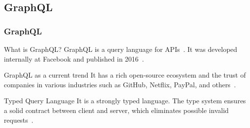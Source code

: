 \subsection{GraphQL}

\begin{frame}\frametitle{GraphQL}

  \begin{block}{What is GraphQL?}
    GraphQL is a query language for APIs~\cite{gql-spec}. It was developed internally at  Facebook and published in 2016~\cite{initial-analysis-of-gql}. 
  \end{block}

  \begin{block}{GraphQL as a current trend}
    It has a rich open-source ecosystem and the trust of companies in various industries such as GitHub, Netflix, PayPal, and others~\cite{morph-gql-1,gql-healthcare}.
  \end{block}

\begin{block}{Typed Query Language}
  It is a strongly typed language. The type system ensures a solid contract between client and server, which eliminates possible invalid requests~\cite{real-time-sys-arc-based-on-gql}.
\end{block}

\end{frame}

